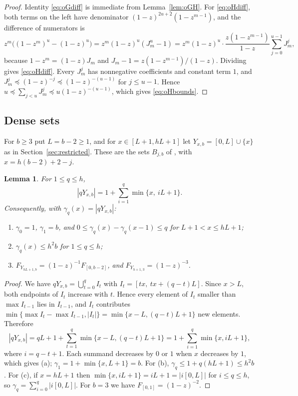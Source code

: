 \documentclass[11pt]{amsart}
\newtheorem{lemma}[theorem]{Lemma}
\theoremstyle{definition}
\theoremstyle{remark}
\numberwithin{equation}{section}
\newcommand{\cle}{\preceq}
\begin{document}
\begin{proof}
Identity \eqref{eq:oGdiff} is immediate from Lemma~\ref{lem:oGH}. For \eqref{eq:oHdiff}, both terms on the left have denominator $(1-z)^{2u+2}(1-z^{m-1})$, and the difference of numerators is
\[
z^m\bigl((1-z^m)^u-(1-z)^u\bigr)=z^m(1-z)^u(J_m^u-1)=z^m(1-z)^u\cdot\frac{z(1-z^{m-1})}{1-z}\sum_{j=0}^{u-1}J_m^j,
\]
because $1-z^m=(1-z)J_m$ and $J_m-1=z(1-z^{m-1})/(1-z)$. Dividing gives \eqref{eq:oHdiff}. Every $J_m^j$ has nonnegative coefficients and constant term $1$, and $J_m^j\cle(1-z)^{-j}\cle(1-z)^{-(u-1)}$ for $j\le u-1$. Hence $u\cle\sum_{j<u}J_m^j\cle u(1-z)^{-(u-1)}$, which gives \eqref{eq:oHbounds}.
\end{proof}

\subsection{Dense sets}
For $b\ge 3$ put $L=b-2\ge 1$, and for $x\in[L+1,hL+1]$ let $Y_{x,b}=[0,L]\cup\{x\}$ as in Section~\ref{sec:restricted}. These are the sets $B_{j,b}$ of \cite[Definition~4.12]{Raj26}, with $x=h(b-2)+2-j$.

\begin{lemma}\label{lem:odense}
For $1\le q\le h$,
\[
|qY_{x,b}|=1+\sum_{i=1}^q\min\{x,\ iL+1\}.
\]
Consequently, with $\gamma_q(x)=|qY_{x,b}|$:
\begin{enumerate}[label=\textup{(\alph*)}]
\item $\gamma_0=1$, $\gamma_1=b$, and $0\le\gamma_q(x)-\gamma_q(x-1)\le q$ for $L+1<x\le hL+1$;
\item $\gamma_q(x)\le h^2b$ for $1\le q\le h$;
\item $F_{Y_{hL+1,b}}=(1-z)^{-1}F_{[0,b-2]}$, and $F_{Y_{h+1,3}}=(1-z)^{-3}$.
\end{enumerate}
\end{lemma}

\begin{proof}
We have $qY_{x,b}=\bigcup_{t=0}^qI_t$ with $I_t=[tx,\ tx+(q-t)L]$. Since $x>L$, both endpoints of $I_t$ increase with $t$. Hence every element of $I_t$ smaller than $\max I_{t-1}$ lies in $I_{t-1}$, and $I_t$ contributes $\min\{\max I_t-\max I_{t-1},|I_t|\}=\min\{x-L,(q-t)L+1\}$ new elements. Therefore
\[
|qY_{x,b}|=qL+1+\sum_{t=1}^q\min\{x-L,(q-t)L+1\}=1+\sum_{i=1}^q\min\{x,iL+1\},
\]
where $i=q-t+1$. Each summand decreases by $0$ or $1$ when $x$ decreases by $1$, which gives (a); $\gamma_1=1+\min\{x,L+1\}=b$. For (b), $\gamma_q\le 1+q(hL+1)\le h^2b$. For (c), if $x=hL+1$ then $\min\{x,iL+1\}=iL+1=|i[0,L]|$ for $i\le q\le h$, so $\gamma_q=\sum_{i=0}^q|i[0,L]|$. For $b=3$ we have $F_{[0,1]}=(1-z)^{-2}$.
\end{proof}
\end{document}
